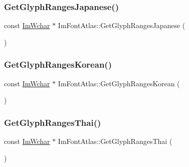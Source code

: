 \mbox{\label{struct_im_font_atlas_a2654afbbf73835bf08278cdc6c181a96}} 
\subsubsection{\texorpdfstring{Get\+Glyph\+Ranges\+Japanese()}{GetGlyphRangesJapanese()}}
{\footnotesize\ttfamily const \mbox{\hyperlink{imgui_8h_af2c7badaf05a0008e15ef76d40875e97}{Im\+Wchar}} $\ast$ Im\+Font\+Atlas\+::\+Get\+Glyph\+Ranges\+Japanese (\begin{DoxyParamCaption}{ }\end{DoxyParamCaption})}

\mbox{\label{struct_im_font_atlas_ac70e07bd35913661c8fc50413b3bf969}} 
\subsubsection{\texorpdfstring{Get\+Glyph\+Ranges\+Korean()}{GetGlyphRangesKorean()}}
{\footnotesize\ttfamily const \mbox{\hyperlink{imgui_8h_af2c7badaf05a0008e15ef76d40875e97}{Im\+Wchar}} $\ast$ Im\+Font\+Atlas\+::\+Get\+Glyph\+Ranges\+Korean (\begin{DoxyParamCaption}{ }\end{DoxyParamCaption})}

\mbox{\label{struct_im_font_atlas_a4985c51d8a5270ff027f13fa44a14371}} 
\subsubsection{\texorpdfstring{Get\+Glyph\+Ranges\+Thai()}{GetGlyphRangesThai()}}
{\footnotesize\ttfamily const \mbox{\hyperlink{imgui_8h_af2c7badaf05a0008e15ef76d40875e97}{Im\+Wchar}} $\ast$ Im\+Font\+Atlas\+::\+Get\+Glyph\+Ranges\+Thai (\begin{DoxyParamCaption}{ }\end{DoxyParamCaption})}

